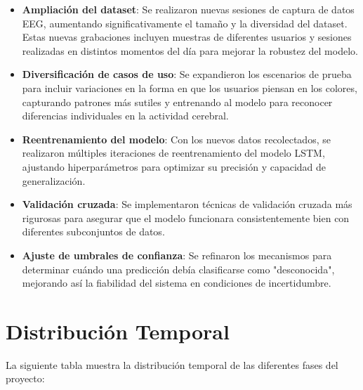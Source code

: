 \begin{itemize}
    \item \textbf{Ampliación del dataset}: Se realizaron nuevas sesiones de captura de datos EEG, aumentando significativamente el tamaño y la diversidad del dataset. Estas nuevas grabaciones incluyen muestras de diferentes usuarios y sesiones realizadas en distintos momentos del día para mejorar la robustez del modelo.
    
    \item \textbf{Diversificación de casos de uso}: Se expandieron los escenarios de prueba para incluir variaciones en la forma en que los usuarios piensan en los colores, capturando patrones más sutiles y entrenando al modelo para reconocer diferencias individuales en la actividad cerebral.
    
    \item \textbf{Reentrenamiento del modelo}: Con los nuevos datos recolectados, se realizaron múltiples iteraciones de reentrenamiento del modelo LSTM, ajustando hiperparámetros para optimizar su precisión y capacidad de generalización.
    
    \item \textbf{Validación cruzada}: Se implementaron técnicas de validación cruzada más rigurosas para asegurar que el modelo funcionara consistentemente bien con diferentes subconjuntos de datos.
    
    \item \textbf{Ajuste de umbrales de confianza}: Se refinaron los mecanismos para determinar cuándo una predicción debía clasificarse como "desconocida", mejorando así la fiabilidad del sistema en condiciones de incertidumbre.
\end{itemize}

\section{Distribución Temporal}

La siguiente tabla muestra la distribución temporal de las diferentes fases del proyecto:


